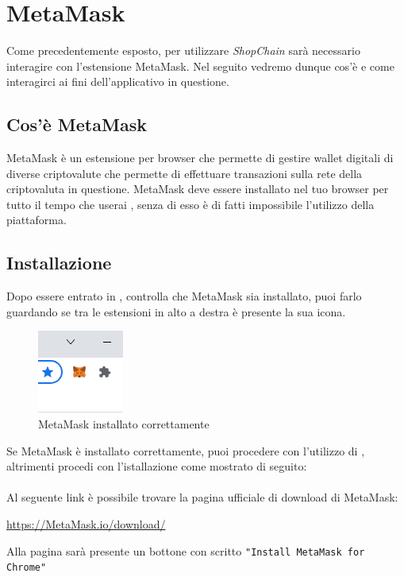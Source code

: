 \section{MetaMask}\label{section:MetaMask}
Come precedentemente esposto, per utilizzare \textit{ShopChain} sarà necessario interagire con l'estensione MetaMask. Nel seguito vedremo dunque cos'è e come interagirci ai fini dell'applicativo in questione.

\subsection{Cos'è MetaMask}
MetaMask è un estensione per browser che permette di gestire wallet digitali di diverse criptovalute\glo{} che permette di effettuare transazioni sulla rete della criptovaluta in questione.
MetaMask deve essere installato nel tuo browser per tutto il tempo che userai \projectName{}, senza di esso è di fatti impossibile l'utilizzo della piattaforma.
\subsection{Installazione}
Dopo essere entrato in \projectName{}, controlla che MetaMask sia installato, puoi farlo guardando se tra le estensioni in alto a destra è presente la sua icona.

    \begin{figure}[H]
        \centering
        \includegraphics{immagini/MetaMask/MetaMask_installed.png}
        \caption{MetaMask installato correttamente}
    \end{figure}   
 Se MetaMask è installato correttamente, puoi procedere con l'utilizzo di \projectName, altrimenti procedi con l'istallazione come mostrato di seguito:\\\\

 Al seguente link è possibile trovare la pagina ufficiale di download di MetaMask:
 \begin{center}
     \url{https://MetaMask.io/download/}
 \end{center}

 Alla pagina sarà presente un bottone con scritto \texttt{"Install MetaMask for Chrome"}

